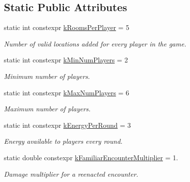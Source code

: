 \subsection*{Static Public Attributes}
\begin{DoxyCompactItemize}
\item 
\mbox{\label{class_antitelephone_game_ae37bf7f9becd1fb13d5b14f18805f34a}} 
static int constexpr \hyperlink{class_antitelephone_game_ae37bf7f9becd1fb13d5b14f18805f34a}{k\+Rooms\+Per\+Player} = 5
\begin{DoxyCompactList}\small\item\em Number of valid locations added for every player in the game. \end{DoxyCompactList}\item 
\mbox{\label{class_antitelephone_game_ad83ef874d5a90a47bca6eedea6f20be4}} 
static int constexpr \hyperlink{class_antitelephone_game_ad83ef874d5a90a47bca6eedea6f20be4}{k\+Min\+Num\+Players} = 2
\begin{DoxyCompactList}\small\item\em Minimum number of players. \end{DoxyCompactList}\item 
\mbox{\label{class_antitelephone_game_af706d2b7289d0d39de8746fb53ea7a4c}} 
static int constexpr \hyperlink{class_antitelephone_game_af706d2b7289d0d39de8746fb53ea7a4c}{k\+Max\+Num\+Players} = 6
\begin{DoxyCompactList}\small\item\em Maximum number of players. \end{DoxyCompactList}\item 
\mbox{\label{class_antitelephone_game_abe921436c4e4102a6d1fe0fb835531af}} 
static int constexpr \hyperlink{class_antitelephone_game_abe921436c4e4102a6d1fe0fb835531af}{k\+Energy\+Per\+Round} = 3
\begin{DoxyCompactList}\small\item\em Energy available to players every round. \end{DoxyCompactList}\item 
\mbox{\label{class_antitelephone_game_af2f7eb8b10811d432c84400b4b55333d}} 
static double constexpr \hyperlink{class_antitelephone_game_af2f7eb8b10811d432c84400b4b55333d}{k\+Familiar\+Encounter\+Multiplier} = 1.
\begin{DoxyCompactList}\small\item\em Damage multiplier for a reenacted encounter. \end{DoxyCompactList}\end{DoxyCompactItemize}



